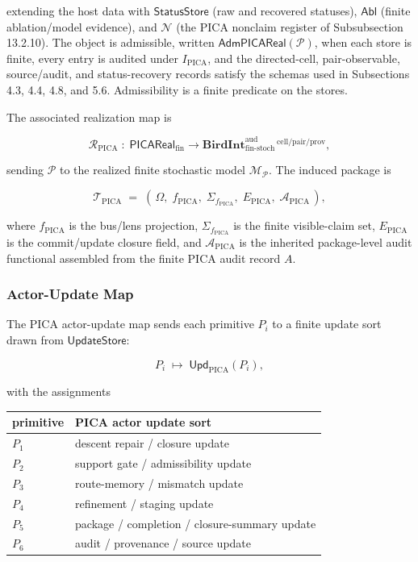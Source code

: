 \documentclass[11pt]{article}
\theoremstyle{definition}
\begin{document}
extending the host data with \(\mathsf{StatusStore}\) (raw and recovered statuses), \(\mathsf{Abl}\) (finite ablation/model evidence), and \(\mathcal N\) (the PICA nonclaim register of Subsubsection 13.2.10). The object is admissible, written \(\mathsf{AdmPICAReal}(\mathcal P)\), when each store is finite, every entry is audited under \(I_{\mathrm{PICA}}\), and the directed-cell, pair-observable, source/audit, and status-recovery records satisfy the schemas used in Subsections 4.3, 4.4, 4.8, and 5.6. Admissibility is a finite predicate on the stores.

The associated realization map is

\[
\mathcal R_{\mathrm{PICA}}\;:\;\mathsf{PICAReal}_{\mathrm{fin}}\longrightarrow
\mathbf{BirdInt}^{\mathrm{aud}}_{\mathrm{fin\text{-}stoch}}{}^{\,\mathrm{cell}/\mathrm{pair}/\mathrm{prov}},
\]

sending \(\mathcal P\) to the realized finite stochastic model \(\mathcal M_{\mathcal P}\). The induced package is

\[
\mathcal T_{\mathrm{PICA}}\;=\;(\,\Omega,\;f_{\mathrm{PICA}},\;\Sigma_{f_{\mathrm{PICA}}},\;E_{\mathrm{PICA}},\;\mathcal A_{\mathrm{PICA}}\,),
\]

where \(f_{\mathrm{PICA}}\) is the bus/lens projection, \(\Sigma_{f_{\mathrm{PICA}}}\) is the finite visible-claim set, \(E_{\mathrm{PICA}}\) is the commit/update closure field, and \(\mathcal A_{\mathrm{PICA}}\) is the inherited package-level audit functional assembled from the finite PICA audit record \(A\).

\subsubsection{Actor-Update Map}

The PICA actor-update map sends each primitive \(P_i\) to a finite update sort drawn from \(\mathsf{UpdateStore}\):

\[
P_i\;\longmapsto\;\mathsf{Upd}_{\mathrm{PICA}}(P_i),
\]

with the assignments

\begin{longtable}[]{@{}ll@{}}
\toprule
primitive & PICA actor update sort\tabularnewline
\midrule
\endhead
\(P_1\) & descent repair / closure update\tabularnewline
\(P_2\) & support gate / admissibility update\tabularnewline
\(P_3\) & route-memory / mismatch update\tabularnewline
\(P_4\) & refinement / staging update\tabularnewline
\(P_5\) & package / completion / closure-summary update\tabularnewline
\(P_6\) & audit / provenance / source update\tabularnewline
\bottomrule
\end{longtable}
\end{document}
